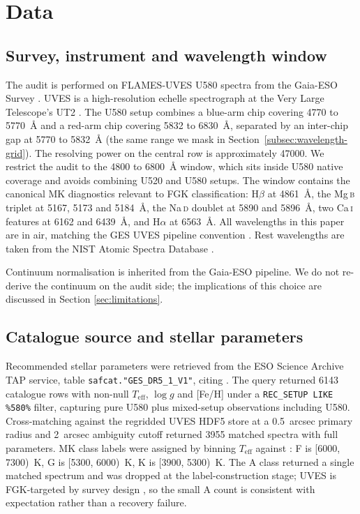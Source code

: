 \documentclass[11pt,a4paper]{article}
\newcommand{\Halpha}{H$\alpha$\xspace}
\newcommand{\Hbeta}{H$\beta$\xspace}
\newcommand{\Mgb}{Mg\,\textsc{b}\xspace}
\newcommand{\NaD}{Na\,\textsc{d}\xspace}
\newcommand{\CaI}{Ca\,\textsc{i}\xspace}
\newcommand{\Teff}{$T_{\mathrm{eff}}$\xspace}
\begin{document}
\section{Data}
\label{sec:data}

\subsection{Survey, instrument and wavelength window}

The audit is performed on FLAMES-UVES U580 spectra from the Gaia-ESO Survey \citep{2022A&A...666A.120G}. UVES is a high-resolution echelle spectrograph at the Very Large Telescope's UT2 \citep{2000SPIE.4008..534D}. The U580 setup combines a blue-arm chip covering 4770 to 5770~\AA{} and a red-arm chip covering 5832 to 6830~\AA{}, separated by an inter-chip gap at 5770 to 5832~\AA{} (the same range we mask in Section~\ref{subsec:wavelength-grid}). The resolving power on the central row is approximately 47000. We restrict the audit to the 4800 to 6800~\AA{} window, which sits inside U580 native coverage and avoids combining U520 and U580 setups. The window contains the canonical MK diagnostics relevant to FGK classification: \Hbeta at 4861~\AA{}, the \Mgb triplet at 5167, 5173 and 5184~\AA{}, the \NaD doublet at 5890 and 5896~\AA{}, two \CaI features at 6162 and 6439~\AA{}, and \Halpha at 6563~\AA{}. All wavelengths in this paper are in air, matching the GES UVES pipeline convention \citep{2014A&A...565A.113S}. Rest wavelengths are taken from the NIST Atomic Spectra Database \citep{NIST_ASD_2023}.

Continuum normalisation is inherited from the Gaia-ESO pipeline. We do not re-derive the continuum on the audit side; the implications of this choice are discussed in Section \ref{sec:limitations}.

\subsection{Catalogue source and stellar parameters}

Recommended stellar parameters were retrieved from the ESO Science Archive TAP service, table \texttt{safcat."GES\_DR5\_1\_V1"}, citing \citet{2023A&A...676A.129H}. The query returned 6143 catalogue rows with non-null \Teff, $\log g$ and [Fe/H] under a \texttt{REC\_SETUP LIKE \%580\%} filter, capturing pure U580 plus mixed-setup observations including U580. Cross-matching against the regridded UVES HDF5 store at a 0.5~arcsec primary radius and 2~arcsec ambiguity cutoff returned 3955 matched spectra with full parameters. MK class labels were assigned by binning \Teff against \citet{2013ApJS..208....9P}: F is [6000, 7300)~K, G is [5300, 6000)~K, K is [3900, 5300)~K. The A class returned a single matched spectrum and was dropped at the label-construction stage; UVES is FGK-targeted by survey design \citep{2022A&A...666A.120G}, so the small A count is consistent with expectation rather than a recovery failure.
\end{document}
